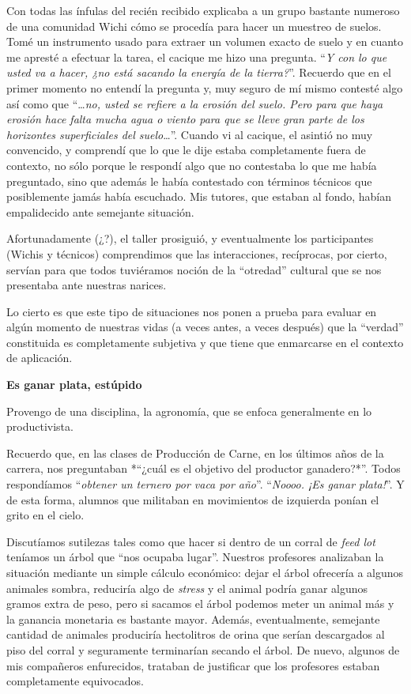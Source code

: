 \begin{fullwidth}
Con todas las ínfulas del recién recibido explicaba a un grupo bastante
numeroso de una comunidad Wichi cómo se procedía para hacer un muestreo
de suelos. Tomé un instrumento usado para extraer un volumen exacto de
suelo y en cuanto me apresté a efectuar la tarea, el cacique me hizo una
pregunta. ``\emph{Y con lo que usted va a hacer, ¿no está sacando la
energía de la tierra?}''. Recuerdo que en el primer momento no entendí
la pregunta y, muy seguro de mí mismo contesté algo así como que
``\ldots{}\emph{no, usted se refiere a la erosión del suelo. Pero para
que haya erosión hace falta mucha agua o viento para que se lleve gran
parte de los horizontes superficiales del suelo}\ldots{}''. Cuando vi al
cacique, el asintió no muy convencido, y comprendí que lo que le dije
estaba completamente fuera de contexto, no sólo porque le respondí algo
que no contestaba lo que me había preguntado, sino que además le había
contestado con términos técnicos que posiblemente jamás había escuchado.
Mis tutores, que estaban al fondo, habían empalidecido ante semejante
situación.

Afortunadamente (¿?), el taller prosiguió, y eventualmente los
participantes (Wichis y técnicos) comprendimos que las interacciones,
recíprocas, por cierto, servían para que todos tuviéramos noción de la
``otredad'' cultural que se nos presentaba ante nuestras narices.

Lo cierto es que este tipo de situaciones nos ponen a prueba para
evaluar en algún momento de nuestras vidas (a veces antes, a veces
después) que la ``verdad'' constituida es completamente subjetiva y que
tiene que enmarcarse en el contexto de aplicación.

\textbf{Es ganar plata, estúpido}

Provengo de una disciplina, la agronomía, que se enfoca generalmente en
lo productivista.

Recuerdo que, en las clases de Producción de Carne, en los últimos años
de la carrera, nos preguntaban *``¿cuál es el objetivo del productor
ganadero?*''. Todos respondíamos ``\emph{obtener un ternero por vaca por
año}''. ``\emph{Noooo. ¡Es ganar plata!}''. Y de esta forma, alumnos que
militaban en movimientos de izquierda ponían el grito en el cielo.

Discutíamos sutilezas tales como que hacer si dentro de un corral de
\emph{feed lot} teníamos un árbol que ``nos ocupaba lugar''. Nuestros
profesores analizaban la situación mediante un simple cálculo económico:
dejar el árbol ofrecería a algunos animales sombra, reduciría algo de
\emph{stress} y el animal podría ganar algunos gramos extra de peso,
pero si sacamos el árbol podemos meter un animal más y la ganancia
monetaria es bastante mayor. Además, eventualmente, semejante cantidad
de animales produciría hectolitros de orina que serían descargados al
piso del corral y seguramente terminarían secando el árbol. De nuevo,
algunos de mis compañeros enfurecidos, trataban de justificar que los
profesores estaban completamente equivocados.


\end{fullwidth}
